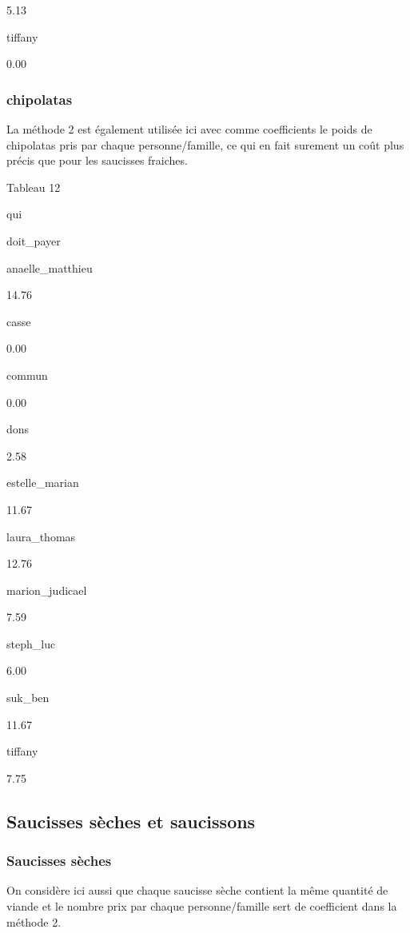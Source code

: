 \documentclass[]{article}
\begin{document}
5.13

tiffany

0.00

\hypertarget{chipolatas}{%
\subsubsection{chipolatas}\label{chipolatas}}

La méthode 2 est également utilisée ici avec comme coefficients le poids
de chipolatas pris par chaque personne/famille, ce qui en fait surement
un coût plus précis que pour les saucisses fraiches.

Tableau 12

qui

doit\_payer

anaelle\_matthieu

14.76

casse

0.00

commun

0.00

dons

2.58

estelle\_marian

11.67

laura\_thomas

12.76

marion\_judicael

7.59

steph\_luc

6.00

suk\_ben

11.67

tiffany

7.75

\hypertarget{saucisses-seches-et-saucissons}{%
\subsection{Saucisses sèches et
saucissons}\label{saucisses-seches-et-saucissons}}

\hypertarget{saucisses-seches}{%
\subsubsection{Saucisses sèches}\label{saucisses-seches}}

On considère ici aussi que chaque saucisse sèche contient la même
quantité de viande et le nombre prix par chaque personne/famille sert de
coefficient dans la méthode 2.
\end{document}
